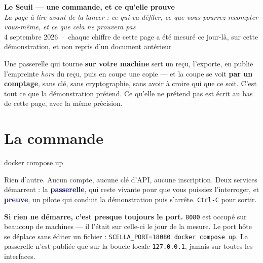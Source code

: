\documentclass[9pt]{extarticle}
\newcommand{\code}[1]{\texttt{\footnotesize #1}}
\newcommand{\mm}[1]{\textbf{\textcolor{navy}{#1}}}
\begin{document}
\begin{center}
{\LARGE\bfseries\color{navy} Le Seuil --- une commande, et ce qu'elle prouve}\\[2pt]
{\small\color{grey}\itshape La page à lire \emph{avant} de la lancer : ce qui va défiler, ce que vous
pourrez recompter vous-même, et ce que cela ne prouvera pas}\\[2pt]
{\footnotesize\color{grey} 4 septembre 2026 \; · \; chaque chiffre de cette page a été mesuré ce
jour-là, sur cette démonstration, et non repris d'un document antérieur}
\end{center}
\vspace{1pt}

\begin{these}
Une passerelle qui tourne \textbf{sur votre machine} sert un reçu, l'exporte, en publie
l'empreinte \emph{hors} du reçu, puis en coupe une copie --- et la coupe se voit \textbf{par un
comptage}, sans clé, sans cryptographie, sans avoir à croire qui que ce soit. C'est tout ce que
la démonstration prétend. Ce qu'elle ne prétend pas est écrit au bas de cette page, avec la même
précision.
\end{these}

\section{La commande}
\begin{cmd}
docker compose up
\end{cmd}
Rien d'autre. Aucun compte, aucune clé d'API, aucune inscription. Deux services démarrent : la
\mm{passerelle}, qui reste vivante pour que vous puissiez l'interroger, et \mm{preuve}, un pilote
qui conduit la démonstration puis s'arrête. \code{Ctrl-C} pour sortir.

\begin{cadre}
\textbf{Si rien ne démarre, c'est presque toujours le port.} \code{8080} est occupé sur beaucoup de
machines --- il l'était sur celle-ci le jour de la mesure. Le port hôte se déplace sans éditer
un fichier :\; \code{SCELLA\_PORT=18080 docker compose up}\;. La passerelle n'est publiée que
sur la boucle locale \code{127.0.0.1}, jamais sur toutes les interfaces.
\end{cadre}
\end{document}
